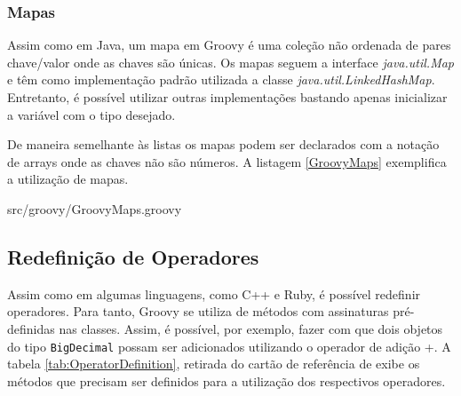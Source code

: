 \documentclass[12pt]{article}
\begin{document}
\subsubsection{Mapas}

    Assim como em Java, um mapa em Groovy é uma coleção não ordenada de pares 
    chave/valor onde as chaves são únicas. Os mapas seguem a interface \emph{java.util.Map}
    e têm como implementação padrão utilizada a classe \emph{java.util.LinkedHashMap}.
    Entretanto, é possível utilizar outras implementações bastando apenas inicializar
    a variável com o tipo desejado.
    
    De maneira semelhante às listas os mapas podem ser declarados com a notação
    de arrays onde as chaves não são números. A listagem \ref{GroovyMaps} exemplifica
    a utilização de mapas.
    
    
                    {src/groovy/GroovyMaps.groovy}
    
\subsection{Redefinição de Operadores}  
    
    Assim como em algumas linguagens, como C++ e Ruby, é possível redefinir operadores.
    Para tanto, Groovy se utiliza de métodos com assinaturas pré-definidas nas classes.
    Assim, é possível, por exemplo, fazer com que dois objetos do tipo \texttt{BigDecimal}
    possam ser adicionados utilizando o operador de adição +. A tabela 
    \ref{tab:OperatorDefinition}, retirada do cartão de referência de \cite{groovy:refcard} 
    exibe os métodos que precisam ser definidos para a utilização dos respectivos 
    operadores.
\end{document}
